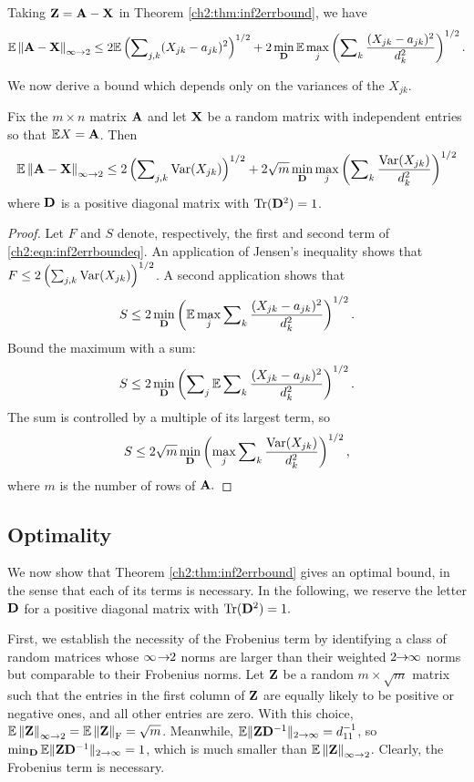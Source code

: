 Taking $\mathbf{Z}=\mathbf{A}-\mathbf{X}$ in Theorem \ref{ch2:thm:inf2errbound}, we have  
\begin{equation}
\mathbb{E}\left\|\mathbf{A}-\mathbf{X}\right\|_{\infty\rightarrow 2}\leq2\mathbb{E}\left(\sum\nolimits_{j,k}(X_{jk}-a_{jk})^{2}
\right)^{1/2}+2\min_{\mathbf{D}}\mathbb{E}\max_{j}\left(\sum\nolimits_{k}\frac{(X_{jk}-a_{
jk})^{2}}{d_{k}^{2}}\right)^{1/2}.
\label{ch2:eqn:inf2errboundeq}
\end{equation}

We now derive a bound which depends only on the variances of the $X_{jk}$.
\begin{cor}
Fix the $m\times n$ matrix $\mathbf{A}$ and let $\mathbf{X}$ be a random matrix with
independent entries so that $\mathbb{E} X=\mathbf{A}$. Then
\[
\mathbb{E}\left\|\mathbf{A}-\mathbf{X}\right\|_{\infty\rightarrow 2}\leq2\left(\sum\nolimits_{j,k}\operatorname{Var}(X_{jk})\right)^{
1/2}+2\sqrt{m}\min_{\mathbf{D}}\max_{j}\left(\sum\nolimits_{k}\frac{\operatorname{Var}(X_{jk})}{
d_{k}^{2}}\right)^{1/2}
\]
where $\mathbf{D}$ is a positive diagonal matrix with $\operatorname{Tr}(\mathbf{D}^{2})=1$.
\label{ch2:cor:inf2errbound}
\end{cor}

\begin{proof}
Let $F$ and $S$ denote, respectively, the first and second term of
\eqref{ch2:eqn:inf2errboundeq}. An application of Jensen's inequality shows that $F
\leq2\left(\sum\nolimits_{j,k}\operatorname{Var}(X_{jk})\right)^{1/2}$.
A second application shows that 
\[
S
\leq2\min_{\mathbf{D}}\left(\mathbb{E}\max_{j}\sum\nolimits_{k}\frac{(X_{jk}-a_{jk})^{2}}{
d_{k}^{2}}\right)^{1/2}.
\]
Bound the maximum with a sum: 
\[
S
\leq2\min_{\mathbf{D}}\left(\sum\nolimits_{j}\mathbb{E}\sum\nolimits_{k}\frac{(X_{jk}-a_{jk
})^{2}}{d_{k}^{2}}\right)^{1/2}.
\]
The sum is controlled by a multiple of its largest term, so
\[
S
\leq2\sqrt{m}\min_{\mathbf{D}}\left(\max_{j}\sum\nolimits_{k}\frac{\operatorname{Var}(X_{jk})}{d_
{k}^{2}}\right)^{1/2},
\]
where $m$ is the number of rows of $\mathbf{A}.$
\end{proof}

\subsection{Optimality}

We now show that Theorem \ref{ch2:thm:inf2errbound} gives an optimal bound, in the
sense that each of its terms is necessary. In the following, we reserve the
letter $\mathbf{D}$ for a positive diagonal matrix with $\operatorname{Tr}(\mathbf{D}^{2})=1.$

First, we establish the necessity of the Frobenius term by identifying a class
of random matrices whose $\infty\!\rightarrow\!\!2$ norms are larger than their weighted
$2\!\!\rightarrow\!\!\infty$ norms but comparable to their Frobenius norms. Let $\mathbf{Z}$ be a
random $m\times\sqrt{m}$ matrix such that the entries in the first column of
$\mathbf{Z}$ are equally likely to be positive or negative ones, and all other
entries are zero. With this choice,
$\mathbb{E}\left\|\mathbf{Z}\right\|_{\infty\rightarrow 2}=\mathbb{E}\left\|\mathbf{Z}\right\|_{\mathrm{F}}=\sqrt{m}$. Meanwhile,
$\mathbb{E}\|\mathbf{Z}\mathbf{D}^{-1}\|_{2 \rightarrow \infty}=d_{11}^{-1}$, so
$\min_{\mathbf{D}}\mathbb{E}\|\mathbf{Z}\mathbf{D}^{-1}\|_{2 \rightarrow \infty}=1$, which is much smaller than
$\mathbb{E}\left\|\mathbf{Z}\right\|_{\infty\rightarrow 2}$. Clearly, the Frobenius term is necessary. 

